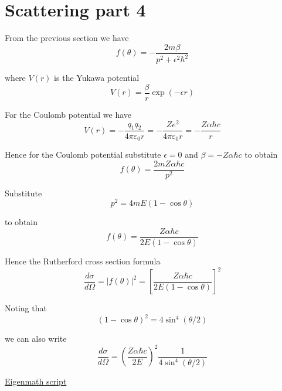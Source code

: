 

\section*{Scattering part 4}

From the previous section we have
\begin{equation*}
f(\theta)=-\frac{2m\beta}{p^2+\epsilon^2\hbar^2}
\end{equation*}

where $V(r)$ is the Yukawa potential
\begin{equation*}
V(r)=\frac{\beta}{r}\exp(-\epsilon r)
\end{equation*}

For the Coulomb potential we have
\begin{equation*}
V(r)=-\frac{q_1q_2}{4\pi\varepsilon_0r}
=-\frac{Ze^2}{4\pi\varepsilon_0r}
=-\frac{Z\alpha\hbar c}{r}
\end{equation*}

Hence for the Coulomb potential substitute $\epsilon=0$ and $\beta=-Z\alpha\hbar c$ to obtain
\begin{equation*}
f(\theta)=\frac{2mZ\alpha\hbar c}{p^2}
\end{equation*}

Substitute
\begin{equation*}
p^2=4mE(1-\cos\theta)
\end{equation*}

to obtain
\begin{equation*}
f(\theta)=\frac{Z\alpha\hbar c}{2E(1-\cos\theta)}
\end{equation*}

Hence the Rutherford cross section formula
\begin{equation*}
\frac{d\sigma}{d\Omega}=|f(\theta)|^2
=\left[\frac{Z\alpha\hbar c}{2E(1-\cos\theta)}\right]^2
\end{equation*}

Noting that
\begin{equation*}
(1-\cos\theta)^2=4\sin^4(\theta/2)
\end{equation*}

we can also write
\begin{equation*}
\frac{d\sigma}{d\Omega}=\left(\frac{Z\alpha\hbar c}{2E}\right)^2
\frac{1}{4\sin^4(\theta/2)}
\end{equation*}

\href{https://georgeweigt.github.io/examples/scattering-part-4-demo.html}{Eigenmath script}


